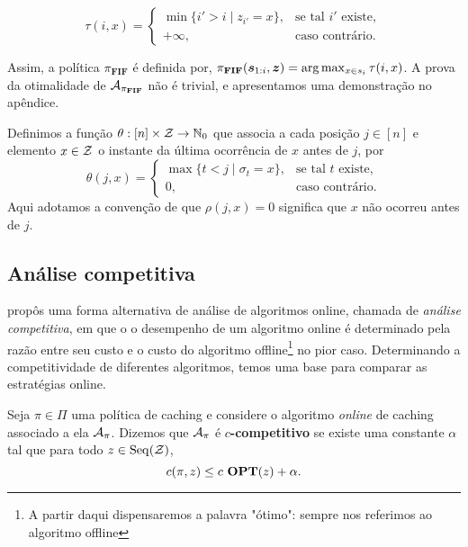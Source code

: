 \begin{equation*}
\tau(i, x) =
\begin{cases}
  \min \{ i' > i \mid z_{i'} = x \}, & \text{se tal } i' \text{ existe}, \\
  +\infty, & \text{caso contrário}.
\end{cases}
\end{equation*}

Assim, a política \( \pi_{\mathbf{FIF}} \) é definida por, \( \pi_{\mathbf{FIF}} (\bm{s}_{1:i}, \bm{z}) = \arg {\max_{x \in s_i} \tau(i, x)}\). A prova da otimalidade de \(\mathcal{A}_{\pi_{\mathbf{FIF}}}\) não é trivial, e apresentamos uma demonstração no apêndice.

\begin{definition}
Definimos a função \(\theta : [n] \times \mathcal{Z} \to \mathbb{N}_0\) que associa a cada posição \(j \in [n]\) e elemento \(x \in \mathcal{Z}\) o instante da última ocorrência de \(x\) antes de \(j\), por
\begin{equation}
\theta(j, x) =
\begin{cases}
  \max\{ t < j \mid \sigma_t = x \}, & \text{se tal } t \text{ existe}, \\[6pt]
  0, & \text{caso contrário}.
\end{cases}
\end{equation}
Aqui adotamos a convenção de que \(\rho(j,x)=0\) significa que \(x\) não ocorreu antes de \(j\).
\end{definition}

\subsection{Análise competitiva}

\textcite{Sleator93} propôs uma forma alternativa de análise de algoritmos online, chamada de \emph{análise competitiva}, em que o o desempenho de um algoritmo online é determinado pela razão entre seu custo e o custo do algoritmo offline\footnote{A partir daqui dispensaremos a palavra "ótimo": sempre nos referimos ao algoritmo offline} no pior caso. Determinando a competitividade de diferentes algoritmos, temos uma base para comparar as estratégias online.

\begin{definition}
  \label{def:comp}
  Seja \(\pi \in \Pi\) uma política de caching e considere o algoritmo \emph{online} de caching associado a ela \(\mathcal{A}_\pi\). Dizemos que \(\mathcal{A}_\pi\) é \(c\)\textbf{-competitivo} se existe uma constante \(\alpha\) tal que para todo \(z \in \operatorname{Seq}(\mathcal{Z})\),
\begin{equation}
  c(\pi, z ) \le c \ \textbf{OPT}(z) + \alpha.
\end{equation}
\end{definition}

